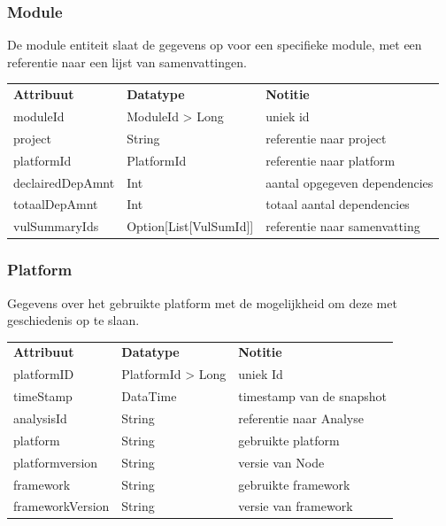 \subsubsection{Module}\label{subsubsec:portalModule}
De module entiteit slaat de gegevens op voor een specifieke module, met een referentie naar een lijst van samenvattingen.

\begin{tabular}{lll}
    \textbf{Attribuut} & \textbf{Datatype}      & \textbf{Notitie}              \\
    moduleId           & ModuleId > Long        & uniek id                      \\
    project            & String                 & referentie naar project       \\
    platformId         & PlatformId             & referentie naar platform      \\
    declairedDepAmnt   & Int                    & aantal opgegeven dependencies \\
    totaalDepAmnt      & Int                    & totaal aantal dependencies    \\
    vulSummaryIds      & Option[List[VulSumId]] & referentie naar samenvatting  \\
\end{tabular}

\subsubsection{Platform}\label{subsubsec:Platform}
Gegevens over het gebruikte platform met de mogelijkheid om deze met geschiedenis op te slaan.

\begin{tabular}{lll}
    \textbf{Attribuut} & \textbf{Datatype} & \textbf{Notitie}          \\
    platformID         & PlatformId > Long & uniek Id                  \\
    timeStamp          & DataTime          & timestamp van de snapshot \\
    analysisId         & String            & referentie naar Analyse   \\
    platform           & String            & gebruikte platform        \\
    platformversion    & String            & versie van Node           \\
    framework          & String            & gebruikte framework       \\
    frameworkVersion   & String            & versie van framework      \\
\end{tabular}

